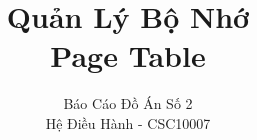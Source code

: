 \documentclass{reportDoCS2025}
\title{Quản Lý Bộ Nhớ \\ Page Table}
\subtitle{Báo Cáo Đồ Án Số 2 \\ Hệ Điều Hành - CSC10007}
\begin{document}
\cover
\numRoman



\contents

\pageNumber











\listTables
\listImages
\end{document}
